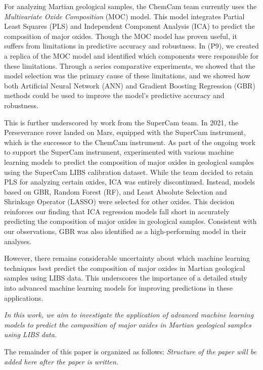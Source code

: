 For analyzing Martian geological samples, the ChemCam team currently uses the \textit{Multivariate Oxide Composition} (MOC) model\cite{cleggRecalibrationMarsScience2017}.
This model integrates Partial Least Squares (PLS) and Independent Component Analysis (ICA) to predict the composition of major oxides.
Though the MOC model has proven useful, it suffers from limitations in predictive accuracy and robustness.
In (P9), we created a replica of the MOC model and identified which components were responsible for these limitations.
Through a series comparative experiments, we showed that the model selection was the primary cause of these limitations, and we showed how both Artificial Neural Network (ANN) and Gradient Boosting Regression (GBR) methods could be used to improve the model's predictive accuracy and robustness.

This is further underscored by work from the SuperCam team.
In 2021, the Perseverance rover landed on Mars, equipped with the SuperCam instrument, which is the successor to the ChemCam instrument.
As part of the ongoing work to support the SuperCam instrument, \citet{andersonPostlandingMajorElement2022} experimented with various machine learning models to predict the composition of major oxides in geological samples using the SuperCam LIBS calibration dataset.
While the team decided to retain PLS for analyzing certain oxides, ICA was entirely discontinued.
Instead, models based on GBR, Random Forest (RF), and Least Absolute Selection and Shrinkage Operator (LASSO) were selected for other oxides.
This decision reinforces our finding that ICA regression models fall short in accurately predicting the composition of major oxides in geological samples.
Consistent with our observations, GBR was also identified as a high-performing model in their analyses.

However, there remains considerable uncertainty about which machine learning techniques best predict the composition of major oxides in Martian geological samples using LIBS data.
This underscores the importance of a detailed study into advanced machine learning models for improving predictions in these applications.

\textit{In this work, we aim to investigate the application of advanced machine learning models to predict the composition of major oxides in Martian geological samples using LIBS data.}

The remainder of this paper is organized as follows:
\textit{Structure of the paper will be added here after the paper is written.}
